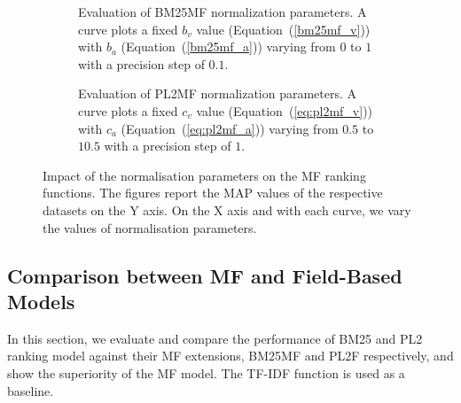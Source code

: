 \begin{figure}
	\centering
	\begin{subfigure}{\textwidth}
		\centering
		
		\addtocounter{subfigure}{-1}
		\caption{Evaluation of BM25MF normalization parameters. A curve plots a fixed $b_v$ value (Equation~(\ref{bm25mf_v})) with $b_a$ (Equation~(\ref{bm25mf_a})) varying from $0$ to $1$ with a precision step of $0.1$.}
		\label{fig:bm25mf-norm}
	\end{subfigure}
	\qquad
	\begin{subfigure}{\textwidth}
		\centering
		
		\addtocounter{subfigure}{-1}
		\caption{Evaluation of PL2MF normalization parameters. A curve plots a fixed $c_v$ value (Equation~(\ref{eq:pl2mf_v})) with $c_a$ (Equation~(\ref{eq:pl2mf_a})) varying from $0.5$ to $10.5$ with a precision step of $1$.}
		\label{fig:pl2mf-norm}
	\end{subfigure}
	\caption{Impact of the normalisation parameters on the MF ranking functions. The figures report the MAP values of the respective datasets on the Y axis. On the X axis and with each curve, we vary the values of normalisation parameters.}
\end{figure}

\subsection{Comparison between MF and Field-Based Models}
\label{sec:mf-field-cmp}

In this section, we evaluate and compare the performance of BM25 and PL2 ranking model against their MF extensions, BM25MF and PL2F respectively, and show the superiority of the MF model. The TF-IDF function is used as a baseline.

